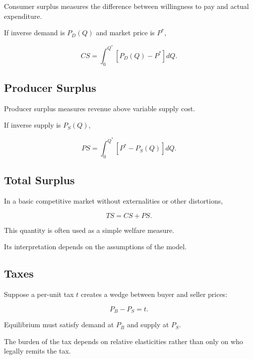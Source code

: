 Consumer surplus measures the difference between willingness to pay and
actual expenditure.

If inverse demand is \(P_D(Q)\) and market price is \(P^*\),

\[
\boxed{
CS
=
\int_0^{Q^*}
\left[
P_D(Q)-P^*
\right]
dQ.
}
\]

\subsection{Producer Surplus}
\label{subsec:producer-surplus}

Producer surplus measures revenue above variable supply cost.

If inverse supply is \(P_S(Q)\),

\[
\boxed{
PS
=
\int_0^{Q^*}
\left[
P^*-P_S(Q)
\right]
dQ.
}
\]

\subsection{Total Surplus}
\label{subsec:total-surplus}

In a basic competitive market without externalities or other distortions,

\[
\boxed{
TS
=
CS+PS.
}
\]

This quantity is often used as a simple welfare measure.

Its interpretation depends on the assumptions of the model.

\subsection{Taxes}
\label{subsec:economic-taxes}

Suppose a per-unit tax \(t\) creates a wedge between buyer and seller prices:

\[
\boxed{
P_B-P_S=t.
}
\]

Equilibrium must satisfy demand at \(P_B\) and supply at \(P_S\).

The burden of the tax depends on relative elasticities rather than only on
who legally remits the tax.

